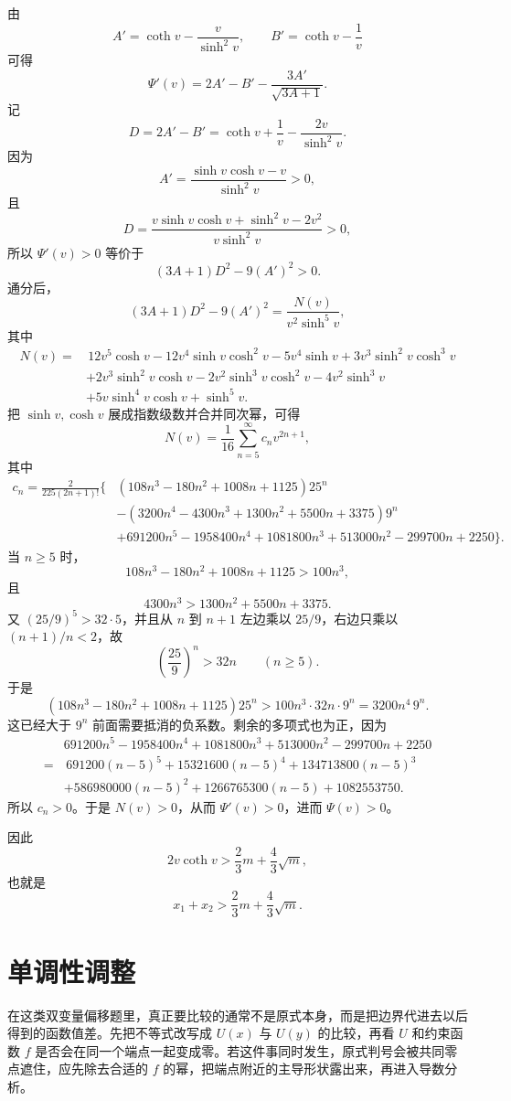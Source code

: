 \begin{solution}
由
\[
A'=\coth v-\frac{v}{\sinh^2v},\qquad
B'=\coth v-\frac1v
\]
可得
\[
\Psi'(v)=2A'-B'-\frac{3A'}{\sqrt{3A+1}}.
\]
记
\[
D=2A'-B'=\coth v+\frac1v-\frac{2v}{\sinh^2v}.
\]
因为
\[
A'=\frac{\sinh v\cosh v-v}{\sinh^2v}>0,
\]
且
\[
D=\frac{v\sinh v\cosh v+\sinh^2v-2v^2}{v\sinh^2v}>0,
\]
所以 \(\Psi'(v)>0\) 等价于
\[
(3A+1)D^2-9(A')^2>0.
\]
通分后，
\[
(3A+1)D^2-9(A')^2=\frac{N(v)}{v^2\sinh^5v},
\]
其中
\begin{align*}
N(v)=&\,12v^5\cosh v-12v^4\sinh v\cosh^2v-5v^4\sinh v
+3v^3\sinh^2v\cosh^3v\\
&+2v^3\sinh^2v\cosh v-2v^2\sinh^3v\cosh^2v-4v^2\sinh^3v\\
&+5v\sinh^4v\cosh v+\sinh^5v.
\end{align*}
把 \(\sinh v,\cosh v\) 展成指数级数并合并同次幂，可得
\[
N(v)=\frac1{16}\sum_{n=5}^{\infty}c_nv^{2n+1},
\]
其中
\begin{align*}
c_n=\frac{2}{225(2n+1)!}\{&
\left(108n^3-180n^2+1008n+1125\right)25^n\\
&-\left(3200n^4-4300n^3+1300n^2+5500n+3375\right)9^n\\
&+691200n^5-1958400n^4+1081800n^3+513000n^2-299700n+2250\}.
\end{align*}
当 \(n\ge5\) 时，
\[
108n^3-180n^2+1008n+1125>100n^3,
\]
且
\[
4300n^3>1300n^2+5500n+3375.
\]
又 \((25/9)^5>32\cdot5\)，并且从 \(n\) 到 \(n+1\) 左边乘以 \(25/9\)，右边只乘以 \((n+1)/n<2\)，故
\[
\left(\frac{25}{9}\right)^n>32n\qquad(n\ge5).
\]
于是
\[
\left(108n^3-180n^2+1008n+1125\right)25^n
>100n^3\cdot32n\cdot9^n
=3200n^4\,9^n.
\]
这已经大于 \(9^n\) 前面需要抵消的负系数。剩余的多项式也为正，因为
\begin{align*}
&691200n^5-1958400n^4+1081800n^3+513000n^2-299700n+2250\\
=&\,691200(n-5)^5+15321600(n-5)^4+134713800(n-5)^3\\
&+586980000(n-5)^2+1266765300(n-5)+1082553750.
\end{align*}
所以 \(c_n>0\)。于是 \(N(v)>0\)，从而 \(\Psi'(v)>0\)，进而 \(\Psi(v)>0\)。

因此
\[
2v\coth v>\frac23m+\frac43\sqrt m,
\]
也就是
\[
x_1+x_2>\frac23m+\frac43\sqrt m.
\]
\end{solution}

\chapter{单调性调整}

在这类双变量偏移题里，真正要比较的通常不是原式本身，而是把边界代进去以后得到的函数值差。先把不等式改写成 \(U(x)\) 与 \(U(y)\) 的比较，再看 \(U\) 和约束函数 \(f\) 是否会在同一个端点一起变成零。若这件事同时发生，原式判号会被共同零点遮住，应先除去合适的 \(f\) 的幂，把端点附近的主导形状露出来，再进入导数分析。

